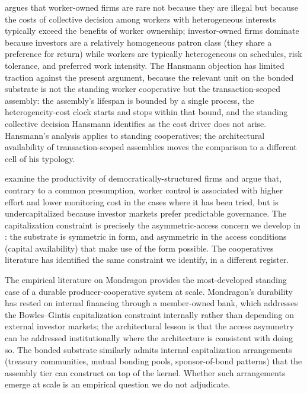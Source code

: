 \documentclass[11pt,a4paper]{article}
\theoremstyle{remark}
\begin{document}
\citet{hansmann1996ownership} argues that worker-owned firms are
rare not because they are illegal but because the costs of
collective decision among workers with heterogeneous interests
typically exceed the benefits of worker ownership; investor-owned
firms dominate because investors are a relatively homogeneous
patron class (they share a preference for return) while workers
are typically heterogeneous on schedules, risk tolerance, and
preferred work intensity. The Hansmann objection has limited
traction against the present argument, because the relevant
unit on the bonded substrate is not the standing worker
cooperative but the transaction-scoped assembly: the assembly's
lifespan is bounded by a single process, the heterogeneity-cost
clock starts and stops within that bound, and the standing
collective decision Hansmann identifies as the cost driver does
not arise. Hansmann's analysis applies to standing cooperatives;
the architectural availability of transaction-scoped assemblies
moves the comparison to a different cell of his typology.

\citet{bowles_gintis_1996} examine the productivity of
democratically-structured firms and argue that, contrary to a
common presumption, worker control is associated with higher
effort and lower monitoring cost in the cases where it has been
tried, but is undercapitalized because investor markets prefer
predictable governance. The capitalization constraint is precisely
the asymmetric-access concern we develop in
: the substrate is symmetric in form, and
asymmetric in the access conditions (capital availability) that
make use of the form possible. The cooperatives literature has
identified the same constraint we identify, in a different
register.

The empirical literature on Mondragon \citep{whyte_whyte_1991,
cheney2002values} provides the most-developed standing case of a
durable producer-cooperative system at scale. Mondragon's
durability has rested on internal financing through a member-owned
bank, which addresses the Bowles--Gintis capitalization constraint
internally rather than depending on external investor markets;
the architectural lesson is that the access asymmetry can be
addressed institutionally where the architecture is consistent
with doing so. The bonded substrate similarly admits internal
capitalization arrangements (treasury communities, mutual bonding
pools, sponsor-of-bond patterns) that the assembly tier can
construct on top of the kernel. Whether such arrangements emerge
at scale is an empirical question we do not adjudicate.
\end{document}
